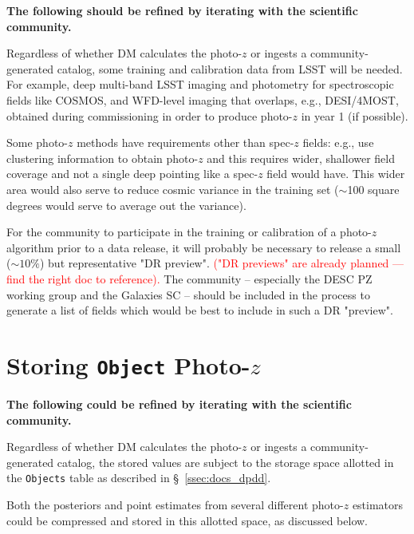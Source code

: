 \documentclass[DM,lsstdraft,toc]{lsstdoc}
\begin{document}
{\bf The following should be refined by iterating with the scientific community.}

Regardless of whether DM calculates the photo-$z$ or ingests a community-generated catalog, some training and calibration data from LSST will be needed.
For example, deep multi-band LSST imaging and photometry for spectroscopic fields like COSMOS, and WFD-level imaging that overlaps, e.g., DESI/4MOST, obtained during commissioning in order to produce photo-$z$ in year 1 (if possible).

Some photo-$z$ methods have requirements other than spec-$z$ fields: e.g., \citet{2019MNRAS.483.2801S} use clustering information to obtain photo-$z$ and this requires wider, shallower field coverage and not a single deep pointing like a spec-$z$ field would have. 
This wider area would also serve to reduce cosmic variance in the training set ($\sim$100 square degrees would serve to average out the variance).

For the community to participate in the training or calibration of a photo-$z$ algorithm prior to a data release, it will probably be necessary to release a small ($\sim10\%$) but representative "DR preview". \textcolor{red}{("DR previews" are already planned --- find the right doc to reference).}
The community -- especially the DESC PZ working group and the Galaxies SC -- should be included in the process to generate a list of fields which would be best to include in such a DR "preview".


\clearpage
\section{Storing {\tt Object} Photo-$z$}\label{sec:store}

{\bf The following could be refined by iterating with the scientific community.}

Regardless of whether DM calculates the photo-$z$ or ingests a community-generated catalog, the stored values are subject to the storage space allotted in the {\tt Objects} table as described in \S~\ref{ssec:docs_dpdd}.

Both the posteriors and point estimates from several different photo-$z$ estimators could be compressed and stored in this allotted space, as discussed below.
\end{document}
